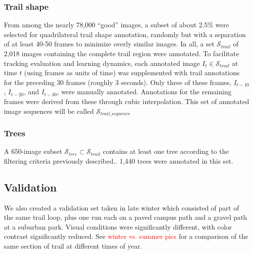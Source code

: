 \documentclass[letterpaper, 10 pt, conference]{ieeeconf}  %
\newcommand{\comment}[1]{\textcolor{red}{#1}}
\newcommand{\TrailAnnotatedSet}{\mathcal{S}_{trail}}
\newcommand{\TrailBadAnnotatedSet}{\mathcal{S}_{bad\_trail}}
\newcommand{\TrailSeqAnnotatedSet}{\mathcal{S}_{trail\_sequence}}
\newcommand{\TreeAnnotatedSet}{\mathcal{S}_{tree}}
\begin{document}
\subsubsection{Trail shape} From among the nearly 78,000 ``good''
images, a subset of about 2.5\% were selected for quadrilateral trail
shape annotation, randomly but with a separation of at least 40-50
frames to minimize overly similar images.  In all, a set
$\TrailAnnotatedSet$ of 2,018 images containing the complete trail
region were annotated.  To facilitate tracking evaluation and learning
dynamics, each annotated image $I_{t} \in \TrailAnnotatedSet$ at time
$t$ (using frames as units of time) was supplemented with trail
annotations for the preceding 30 frames (roughly 3 seconds).  Only
three of these frames, $I_{t-10}$, $I_{t-20}$, and $I_{t-30}$, were
manually annotated.  Annotations for the remaining frames were derived
from these through cubic interpolation.  This set of
annotated image sequences will be called $\TrailSeqAnnotatedSet$



\subsubsection{Trees} A 650-image subset $\TreeAnnotatedSet \subset
\TrailAnnotatedSet$ contains at least one tree according to the
filtering criteria previously described..  1,440 trees were
annotated in this set.


\subsection{Validation}

We also created a validation set taken in late winter which consisted
of part of the same trail loop, plus one run each on a paved campus
path and a gravel path at a suburban park.  Visual conditions were
significantly different, with color contrast significantly reduced.
See \comment{winter vs. summer pics} for a comparison of the same
section of trail at different times of year.
\end{document}
